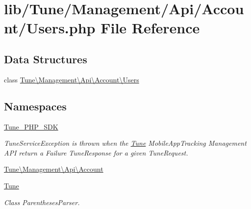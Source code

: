 \hypertarget{Users_8php}{\section{lib/\-Tune/\-Management/\-Api/\-Account/\-Users.php File Reference}
\label{Users_8php}
}
\subsection*{Data Structures}
\begin{DoxyCompactItemize}
\item 
class \hyperlink{classTune_1_1Management_1_1Api_1_1Account_1_1Users}{Tune\textbackslash{}\-Management\textbackslash{}\-Api\textbackslash{}\-Account\textbackslash{}\-Users}
\end{DoxyCompactItemize}
\subsection*{Namespaces}
\begin{DoxyCompactItemize}
\item 
\hyperlink{namespaceTune__PHP__SDK}{Tune\-\_\-\-P\-H\-P\-\_\-\-S\-D\-K}
\begin{DoxyCompactList}\small\item\em Tune\-Service\-Exception is thrown when the \hyperlink{namespaceTune}{Tune} Mobile\-App\-Tracking Management A\-P\-I return a Failure Tune\-Response for a given Tune\-Request. \end{DoxyCompactList}\item 
\hyperlink{namespaceTune_1_1Management_1_1Api_1_1Account}{Tune\textbackslash{}\-Management\textbackslash{}\-Api\textbackslash{}\-Account}
\item 
\hyperlink{namespaceTune}{Tune}
\begin{DoxyCompactList}\small\item\em Class Parentheses\-Parser. \end{DoxyCompactList}\end{DoxyCompactItemize}
